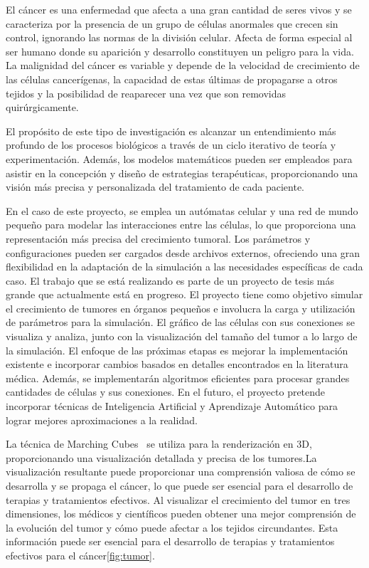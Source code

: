 \documentclass[a4paper,11pt]{article}
\begin{document}
{El cáncer es una enfermedad que afecta a una gran cantidad de seres vivos y se caracteriza por la presencia de un grupo de células anormales que crecen sin control, ignorando las normas de la división celular. Afecta de forma especial al ser humano donde su aparición y desarrollo constituyen un peligro para la vida. La malignidad del cáncer es variable y depende de la velocidad de crecimiento de las células cancerígenas, la capacidad de estas últimas de propagarse a otros tejidos y la posibilidad de reaparecer una vez que son removidas quirúrgicamente.~\cite{7} 

El propósito de este tipo de investigación es alcanzar un entendimiento más profundo de los procesos biológicos a través de un ciclo iterativo de teoría y experimentación. Además, los modelos matemáticos pueden ser empleados para asistir en la concepción y diseño de estrategias terapéuticas, proporcionando una visión más precisa y personalizada del tratamiento de cada paciente.~\cite{7}

En el caso de este proyecto, se emplea un autómatas celular y una red de mundo pequeño para modelar las interacciones entre las células, lo que proporciona una representación más precisa del crecimiento tumoral. Los parámetros y configuraciones pueden ser cargados desde archivos externos, ofreciendo una gran flexibilidad en la adaptación de la simulación a las necesidades específicas de cada caso. El trabajo que se está realizando es parte de un proyecto de tesis más grande que actualmente está en progreso. El proyecto tiene como objetivo simular el crecimiento de tumores en órganos pequeños e involucra la carga y utilización de parámetros para la simulación. El gráfico de las células con sus conexiones se visualiza y analiza, junto con la visualización del tamaño del tumor a lo largo de la simulación. El enfoque de las próximas etapas es mejorar la implementación existente e incorporar cambios basados en detalles encontrados en la literatura médica. Además, se implementarán algoritmos eficientes para procesar grandes cantidades de células y sus conexiones. En el futuro, el proyecto pretende incorporar técnicas de Inteligencia Artificial y Aprendizaje Automático para lograr mejores aproximaciones a la realidad.

La técnica de Marching Cubes~\cite{5} se utiliza para la renderización en 3D, proporcionando una visualización detallada y precisa de los tumores.La visualización resultante puede proporcionar una comprensión valiosa de cómo se desarrolla y se propaga el cáncer, lo que puede ser esencial para el desarrollo de terapias y tratamientos efectivos. Al visualizar el crecimiento del tumor en tres dimensiones, los médicos y científicos pueden obtener una mejor comprensión de la evolución del tumor y cómo puede afectar a los tejidos circundantes. Esta información puede ser esencial para el desarrollo de terapias y tratamientos efectivos para el cáncer\ref{fig:tumor}.

}
\end{document}
